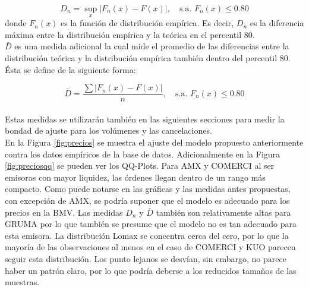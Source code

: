 \documentclass[11pt]{article}
\numberwithin{equation}{section} %
\begin{document}
\[
D_n=\sup_x |F_n(x)-F(x)|,\quad \text{s.a. } F_n(x)\leq 0.80
\]
donde $F_n(x)$ es la función de distribución empírica. Es decir, $D_n$ es la diferencia máxima entre la distribución empírica y la teórica en el percentil 80.\\

$\bar{D}$ es una medida adicional la cual mide el promedio de las diferencias entre la distribución teórica y la distribución empírica también dentro del percentil 80. Ésta se define de la siguiente forma:

\[
\bar{D}=\frac{\sum |F_n(x)-F(x)|}{n},\quad \text{s.a. } F_n(x)\leq 0.80
\]\\

Estas medidas se utilizarán también en las siguientes secciones para medir la bondad de ajuste para los volúmenes y las cancelaciones.\\

En la Figura \ref{fig:precios} se muestra el ajuste del modelo propuesto anteriormente contra los datos empíricos de la base de datos. Adicionalmente en la Figura \ref{fig:preciosqq} se pueden ver los QQ-Plots. Para AMX y COMERCI al ser emisoras con mayor liquidez, las órdenes llegan dentro de un rango más compacto. Como puede notarse en las gráficas y las medidas antes propuestas, con excepción de AMX, se podría suponer que el modelo es adecuado para los precios en la BMV. Las medidas $D_n$ y $\bar{D}$ también son relativamente altas para GRUMA por lo que también se presume que el modelo no es tan adecuado para esta emisora. La distribución Lomax se concentra cerca del cero, por lo que la mayoría de las observaciones al menos en el caso de COMERCI y KUO parecen seguir esta distribución. Los punto lejanos se desvían, sin embargo, no parece haber un patrón claro, por lo que podría deberse a los reducidos tamaños de las muestras.
\end{document}
